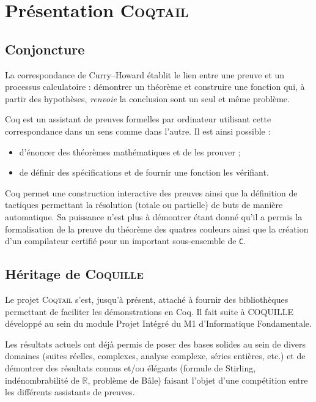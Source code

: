 \documentclass[11pt]{article}
\newcommand{\coqtail}{\textsc{Coqtail}}
\newcommand{\coquille}{\textsc{Coquille}}
\begin{document}
\section{Présentation \coqtail{}}

\subsection{Conjoncture}

La correspondance de Curry--Howard établit le lien entre une preuve et un processus calculatoire : démontrer un théorème et construire une fonction qui, à partir des hypothèses, \emph{renvoie} la conclusion sont un seul et même problème.

Coq\cite{L:BC04} est un assistant de preuves formelles par ordinateur utilisant cette correspondance dans un sens comme dans l'autre. Il est ainsi possible :
\begin{itemize}
  \item d'énoncer des théorèmes mathématiques et de les prouver ;
  \item de définir des spécifications et de fournir une fonction les vérifiant.
\end{itemize}

Coq permet une construction interactive des preuves ainsi que la définition de tactiques permettant la résolution (totale ou partielle) de buts de manière automatique. Sa puissance n'est plus à démontrer étant donné qu'il a permis la formalisation de la preuve du théorème des quatres couleurs\cite{Gonthier07} ainsi que la création d'un compilateur certifié pour un important sous-ensemble de \texttt{C}\cite{compcert}.

\subsection{Héritage de \coquille{}}

Le projet \coqtail{} s'est, jusqu'à présent, attaché à fournir des bibliothèques permettant de faciliter les démonstrations en Coq. Il fait suite à COQUILLE développé au sein du module Projet Intégré du M1 d'Informatique Fondamentale.

Les résultats actuels ont déjà permis de poser des bases solides au sein de divers domaines (suites réelles, complexes, analyse complexe, séries entières, etc.) et de démontrer des résultats connus et/ou élégants (formule de Stirling, indénombrabilité de $\mathbb{R}$, problème de Bâle) faisant l'objet d'une compétition entre les différents assistants de preuves\cite{Freek}.
\end{document}
